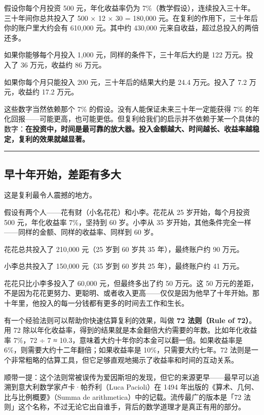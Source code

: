 \documentclass[a4paper,11pt,oneside,fontset=none,UTF8,zihao=-4]{ctexbook}
\begin{document}
假设你每个月投资 500 元，年化收益率仍为
7\%（教学假设），连续投入三十年。三十年间你总共投入了 500 × 12 × 30 =
180,000 元。在复利的作用下，三十年后你的账户里大约会有 610,000
元。其中约 430,000 元来自收益，超过总投入的两倍还多。

如果你能够每个月投入 1,000 元，同样的条件下，三十年后大约是 122
万元。投入了 36 万元，收益约 86 万元。

如果你每个月只能投入 200 元，三十年后的结果大约是 24.4 万元。投入了 7.2
万元，收益约 17.2 万元。

这些数字当然依赖那个 7\% 的假设。没有人能保证未来三十年一定能获得 7\%
的年化回报------可能更高，也可能更低。但复利给我们的启示并不依赖于某一个具体的数字：\textbf{在投资中，时间是最可靠的放大器。投入金额越大、时间越长、收益率越稳定，复利的效果就越显著。}

\begin{center}{\color{dh-bronze}\rule{0.2\textwidth}{0.5pt}}\end{center}

\subsection{早十年开始，差距有多大}\label{ux65e9ux5341ux5e74ux5f00ux59cbux5deeux8dddux6709ux591aux5927}

这是复利最令人震撼的地方。

假设有两个人------花有财（小名花花）和小李。花花从 25 岁开始，每个月投资
500 元，年化收益率 7\%，坚持到 60 岁。小李从 35
岁开始，其他条件完全一样------同样的金额、同样的收益率、同样到 60 岁。

花花总共投入了 210,000 元（25 岁到 60 岁共 35 年），最终账户约 90 万元。

小李总共投入了 150,000 元（35 岁到 60 岁共 25 年），最终账户约 41 万元。

花花只比小李多投入了 60,000 元，但最终多出了约 50 万元。这 50
万元的差距，不是因为花花更努力、更聪明、或者收入更高------仅仅是因为他早了十年开始。那十年里，他投入的每一分钱都有更多的时间去工作和生长。

有一个经验法则可以帮助你快速估算复利的效果，叫做 \textbf{72 法则（Rule
of 72）}。用 72
除以年化收益率，得到的结果就是本金翻倍大约需要的年数。比如年化收益率
7\%，72 ÷ 7 ≈ 10.3，意味着大约十年你的本金可以翻一倍。如果收益率是
6\%，则需要大约十二年翻倍；如果收益率是 10\%，只需要大约七年。72
法则是一个非常粗略的估算工具，但它足够直观地揭示了收益率和时间的互动关系。

顺带一提：这个法则常被误传为爱因斯坦的发现，但它的来源更早------最早可以追溯到意大利数学家卢卡·帕乔利（Luca
Pacioli）在 1494 年出版的《算术、几何、比与比例概要》（Summa de
arithmetica）中的记载。流传最广的版本是「72
法则」这个名称，不过无论它出自谁手，背后的数学道理才是真正有用的部分。
\end{document}
